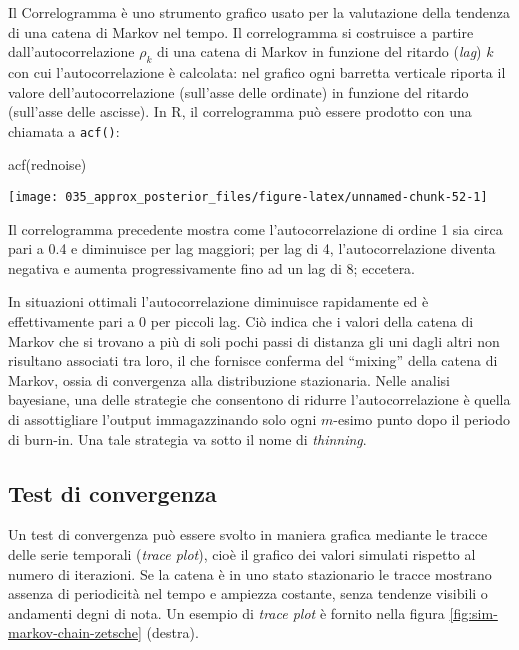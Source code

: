 \documentclass[
]{memoir}
\newenvironment{Shaded}{\begin{snugshade}}{\end{snugshade}}
\newcommand{\FunctionTok}[1]{\textcolor[rgb]{0.00,0.00,0.00}{#1}}
\newcommand{\NormalTok}[1]{#1}
\begin{document}
Il Correlogramma è uno strumento grafico usato per la valutazione della tendenza di una catena di Markov nel tempo. Il correlogramma si costruisce a partire dall'autocorrelazione \(\rho_k\) di una catena di Markov in funzione del ritardo (\emph{lag}) \(k\) con cui l'autocorrelazione è calcolata: nel grafico ogni barretta verticale riporta il valore dell'autocorrelazione (sull'asse delle ordinate) in funzione del ritardo (sull'asse delle ascisse). In R, il correlogramma può essere prodotto con una chiamata a \texttt{acf()}:

\begin{Shaded}
\begin{Highlighting}[]
\FunctionTok{acf}\NormalTok{(rednoise)}
\end{Highlighting}
\end{Shaded}

\begin{center}\texttt{[image: 035\_approx\_posterior\_files/figure-latex/unnamed-chunk-52-1]} \end{center}

Il correlogramma precedente mostra come l'autocorrelazione di ordine 1 sia circa pari a 0.4 e diminuisce per lag maggiori; per lag di 4, l'autocorrelazione diventa negativa e aumenta progressivamente fino ad un lag di 8; eccetera.

In situazioni ottimali l'autocorrelazione diminuisce rapidamente ed è effettivamente pari a 0 per piccoli lag. Ciò indica che i valori della catena di Markov che si trovano a più di soli pochi passi di distanza gli uni dagli altri non risultano associati tra loro, il che fornisce conferma del ``mixing'' della catena di Markov, ossia di convergenza alla distribuzione stazionaria.
Nelle analisi bayesiane, una delle strategie che consentono di ridurre l'autocorrelazione è quella di assottigliare l'output immagazzinando solo ogni \(m\)-esimo punto dopo il periodo di burn-in. Una tale strategia va sotto il nome di \emph{thinning}.

\hypertarget{test-di-convergenza}{%
\subsection{Test di convergenza}\label{test-di-convergenza}}

Un test di convergenza può essere svolto in maniera grafica mediante le tracce delle serie temporali (\emph{trace plot}), cioè il grafico dei valori simulati rispetto al numero di iterazioni. Se la catena è in uno stato stazionario le tracce mostrano assenza di periodicità nel tempo e ampiezza costante, senza tendenze visibili o andamenti degni di nota. Un esempio di \emph{trace plot} è fornito nella figura \ref{fig:sim-markov-chain-zetsche} (destra).
\end{document}
